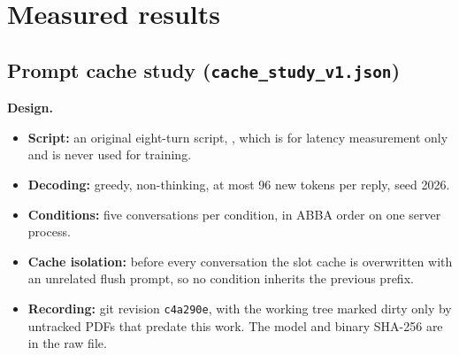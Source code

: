 \documentclass[11pt,a4paper]{article}
\newcommand{\code}[1]{\texttt{#1}}
\newcommand{\field}[1]{\textbf{#1}\quad}
\begin{document}
\section{Measured results}\label{sec:results}

\subsection{Prompt cache study (\code{cache\_study\_v1.json})}

\field{Design.}
\begin{itemize}
  \item \textbf{Script:} an original eight-turn script,
        , which is for latency measurement only
        and is never used for training.
  \item \textbf{Decoding:} greedy, non-thinking, at most 96 new tokens per reply, seed
        2026.
  \item \textbf{Conditions:} five conversations per condition, in ABBA order on one
        server process.
  \item \textbf{Cache isolation:} before every conversation the slot cache is overwritten
        with an unrelated flush prompt, so no condition inherits the previous prefix.
  \item \textbf{Recording:} git revision \code{c4a290e}, with the working tree marked
        dirty only by untracked PDFs that predate this work. The model and binary SHA-256
        are in the raw file.
\end{itemize}
\end{document}
